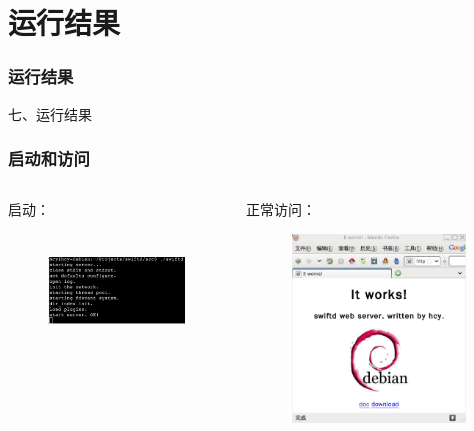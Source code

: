\documentclass[10pt,dvipdfm]{beamer}
\begin{document}
\section{运行结果}

\begin{frame}
	\frametitle{运行结果}
	\begin{center}
	{\Large
		七、运行结果
	}
	\end{center}
\end{frame}

\begin{frame}
	\frametitle{启动和访问}
	\begin{columns}
		\begin{column}{0.4\textwidth}
			\begin{block}{启动：}
			\begin{figure}[htbp]
			\centering
			\includegraphics[height=3cm, width=4.5cm]{pics/startup.eps}
			\end{figure}
			\end{block}
		\end{column}
		
		\begin{column}{0.5\textwidth}
			\begin{block}{正常访问：}
			\begin{figure}[htbp]
			\centering
			\includegraphics[height=5cm, width=6cm]{pics/works.eps}
			\end{figure}
			\end{block}
		\end{column}
	\end{columns}
\end{frame}
\end{document}
